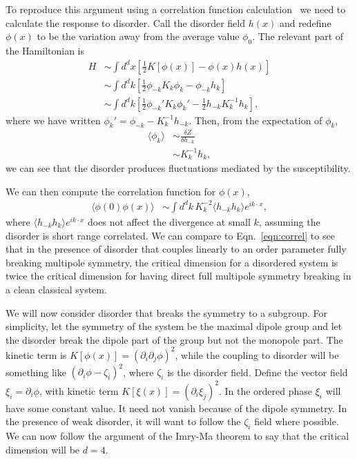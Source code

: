 \documentclass[pra,aps,twocolumn, amsfonts,amsmath,amssymb,nofootinbib,superscriptaddress]{revtex4-2}
\newcommand{\nn}{\nonumber\\}
\newcommand{\half}{\frac{1}{2}}
\begin{document}
To reproduce this argument using a correlation function calculation~\cite{ImryMa} we need to calculate the response to disorder. Call the disorder field $h(x)$ and redefine $\phi(x)$ to be the variation away from the average value $\phi_0$. The relevant part of the Hamiltonian is 
\begin{align}
H &\sim \int d^dx \left[ \half K[ \phi(x)] - \phi(x) h(x) \right] \nn
&\sim \int d^dk \left[ \half \phi_{-k} K_k \phi_k - \phi_{-k} h_k \right] \nn
&\sim \int d^dk \left[ \half \phi_{-k}' K_k \phi_k' - \half h_{-k} K^{-1}_k h_k \right],
\end{align}
where we have written $\phi_k' = \phi_{-k} - K^{-1}_k h_{-k}$. Then, from the expectation of $\phi_k$,
\begin{align}
\langle \phi_k \rangle &\sim \frac{\delta Z}{\delta h_{-k} } \nn
&\sim K_k^{-1} h_{k},
\end{align}
we can see that the disorder produces fluctuations mediated by the susceptibility.

We can then compute the correlation function for $\phi(x)$,
\begin{align}
\langle \phi(0) \phi(x) \rangle &\sim \int d^dk \, K_k^{-2} \langle h_{-k} h_{k} \rangle e^{ik\cdot x},
\end{align}
where $\langle h_{-k} h_{k} \rangle e^{ik\cdot x}$ does not affect the divergence at small $k$, assuming the disorder is short range correlated. We can compare to Eqn.~\ref{eqn:correl} to see that in the presence of disorder that couples linearly to an order parameter fully breaking multipole symmetry, the critical dimension for a disordered system is twice the critical dimension for having direct full multipole symmetry breaking in a clean classical system.

We will now consider disorder that breaks the symmetry to a subgroup. For simplicity, let the symmetry of the system be the maximal dipole group and let the disorder break the dipole part of the group but not the monopole part. The kinetic term is $K[\phi(x)]= (\partial_i \partial_j \phi)^2$, while the coupling to disorder will be something like $(\partial_i\phi - \zeta_i)^2$, where $\zeta_i$ is the disorder field. 
Define the vector field $\xi_i = \partial_i\phi$, with kinetic term $K[\xi(x)]= (\partial_i \xi_j)^2$. In the ordered phase $\xi_i$ will have some constant value. It need not vanish because of the dipole symmetry. In the presence of weak disorder, it will want to follow the $\zeta_i$ field where possible. We can now follow the argument of the Imry-Ma theorem to say that the critical dimension will be $d=4$.
\end{document}
